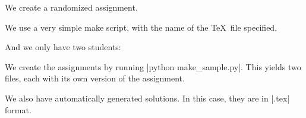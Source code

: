 \documentclass[11pt]{article}
\begin{document}

We create a randomized assignment.

We use a very simple make script, with the name of the \TeX\ file specified.

And we only have two students:

We create the assignments by running |python make_sample.py|.  This yields two files, each with its own version of the assignment.
\begin{center}
\end{center}

\begin{center}
\end{center}

We also have automatically generated solutions.  In this case, they are in |.tex| format.
\begin{center}
\end{center}
\end{document}
